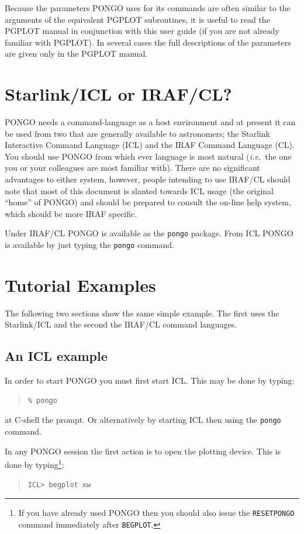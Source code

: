 \documentclass[twoside,11pt]{article}
\newcommand{\htmlref}[2]{#1}
\renewcommand{\_}{\texttt{\symbol{95}}}
\newcommand{\ie}{{\em i.e.\ }}
\newcommand{\cnam}[1]{{\tt #1}}
\newcommand{\iref} [1]{\htmlref{#1}{#1}}
\begin{document}
Because the parameters PONGO uses for its commands are often similar
to the arguments of the equivalent PGPLOT subroutines, it is useful to
read the PGPLOT manual in conjunction with this user guide (if you are
not already familiar with PGPLOT).
In several cases the full descriptions of the parameters are given
only in the PGPLOT manual.

\section{Starlink/ICL or IRAF/CL?}
PONGO needs a command-language as a host environment and at present it
can be used from two that are generally available to astronomers; the
Starlink Interactive Command Language (ICL) and the IRAF Command
Language (CL).  You should use PONGO from which ever language is most
natural (\ie the one you or your colleagues are most familiar
with). There are no significant advantages to either system, however,
people intending to use IRAF/CL should note that most of this document
is slanted towards ICL usage (the original ``home'' of PONGO) and
should be prepared to consult the on-line help system, which should be
more IRAF specific.

Under IRAF/CL PONGO is available as the \verb+pongo+ package. From ICL
PONGO is available by just typing the \verb+pongo+ command.

\section{Tutorial Examples}
The following two sections show the same simple example. The first
uses the Starlink/ICL and the second the IRAF/CL command
languages.

\subsection{An ICL example}

In order to start PONGO you must first start ICL. This may be done by typing:
\begin{quote}
\begin{verbatim}
% pongo
\end{verbatim}
\end{quote}
at C-shell the prompt. Or alternatively by starting ICL then using the
\verb+pongo+ command.

In any PONGO session the first action is to open the plotting device.
This is done by typing\footnote{ If you have already used PONGO then
you should also issue the \cnam{\iref{RESETPONGO}} command immediately
after \cnam{\iref{BEGPLOT}}.}:
\begin{quote}
\begin{verbatim}
ICL> begplot xw
\end{verbatim}
\end{quote}
\end{document}
